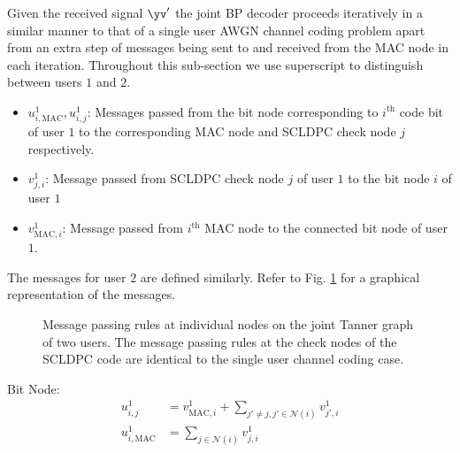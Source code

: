 \documentclass[final,onecolumn,12pt]{IEEEtran}
\begin{document}
Given the received signal $\yv'$ the joint BP decoder proceeds iteratively in a similar manner to that of a single user AWGN channel coding problem apart from an extra step of messages being sent to and received from the MAC node in each iteration. Throughout this sub-section we use superscript to distinguish between users $1$ and $2$.
\begin{itemize}
\item $u^{1}_{i,\text{MAC}},u^{1}_{i,j}$: Messages passed from the bit node corresponding to $i^{\text{th}}$ code bit of user $1$ to the corresponding MAC node and  SCLDPC check node $j$ respectively.
\item $v^{1}_{j,i}$: Message passed from SCLDPC check node $j$ of user $1$ to the bit node $i$ of user $1$
\item $v^{1}_{\text{MAC},i}$: Message passed from $i^{\text{th}}$ MAC node to the connected bit node of user $1$.
\end{itemize}
The messages for user $2$ are defined similarly. Refer to Fig. \ref{fig:BP_computationgraph} for a graphical representation of the messages.

\begin{figure}[h!]
  \centering
  \resizebox{0.75\textwidth}{!}{}
  \caption{ Message passing rules at individual nodes on the joint Tanner graph of two users. The message passing rules at the check nodes of the SCLDPC code are identical to the single user channel coding case.}
  \label{fig:BP_computationgraph}
\end{figure}

Bit Node:
\begin{align*}
u^{1}_{i,j}&=v^{1}_{\text{MAC},i}+ \sum_{j'\neq j,j'\in \mathcal{N}(i)} v^{1}_{j',i}\\
u^{1}_{i,\text{MAC}}&=\sum_{j\in \mathcal{N}(i)} v^{1}_{j,i}
\end{align*}
\end{document}
